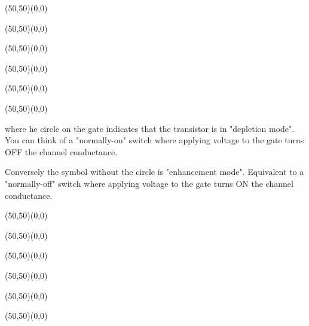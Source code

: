 	\vspace{2cm}
	\begin{center}
	\begin{picture}(50,50)(0,0)
	\end{picture}
	\begin{picture}(50,50)(0,0)
	\end{picture}
	\begin{picture}(50,50)(0,0)
	\end{picture}
	\begin{picture}(50,50)(0,0)
	\end{picture}
	\begin{picture}(50,50)(0,0)
	\end{picture}
	\begin{picture}(50,50)(0,0) %
	\end{picture}
	\end{center}
	where he circle on the gate indicates that the transistor is in "depletion mode".  You can think of a "normally-on" switch where applying voltage to the gate turns OFF the channel conductance.  
	
	Conversely the symbol without the circle is "enhancement mode".
Equivalent to a "normally-off" switch where applying voltage to the gate turns ON the channel conductance.
	\vspace{1cm}
	\begin{center}
	\begin{picture}(50,50)(0,0)
	\end{picture}
	\begin{picture}(50,50)(0,0)
	\end{picture}
	\begin{picture}(50,50)(0,0)
	\end{picture}
	\begin{picture}(50,50)(0,0)
	\end{picture}
	\begin{picture}(50,50)(0,0)
	\end{picture}
	\begin{picture}(50,50)(0,0)
	\end{picture}\\[2cm]
	\end{center}
	
